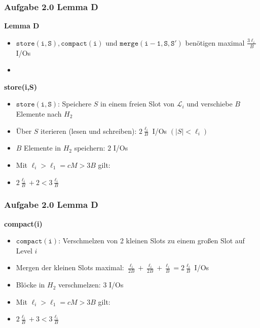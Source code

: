 \documentclass[aspectratio=169]{beamer}
\begin{document}
\begin{frame}
\frametitle{Aufgabe 2.0 Lemma D}

\textbf{Lemma D}
\begin{itemize}
	\item $\mathtt{store(i,S), compact(i)}$ und $\mathtt{merge(i-1,S,S')}$ benötigen maximal $\frac{3\ell_i}{B}$ I/Os
	\item[]
\end{itemize}
\textbf{store(i,S)}
\begin{itemize}
	\item $\mathtt{store(i,S)}$: Speichere $S$ in einem freien Slot von $\mathcal{L}_i$ und verschiebe $B$ Elemente nach $H_2$
	\item Über $S$ iterieren (lesen und schreiben): $2\frac{\ell_i}{B}$ I/Os $(|S| < \ell_i)$
	\item $B$ Elemente in $H_2$ speichern: $2$ I/Os
	\item Mit $\ell_i > \ell_1 = cM > 3B$ gilt:
	\item $2\frac{\ell_i}{B} + 2 < 3\frac{\ell_i}{B}$
	
\end{itemize}

\end{frame}

\begin{frame}
\frametitle{Aufgabe 2.0 Lemma D}

\textbf{compact(i)}
\begin{itemize}
	\item $\mathtt{compact(i)}$: Verschmelzen von 2 kleinen Slots zu einem großen Slot auf Level $i$
	\item Mergen der kleinen Slots maximal: $\frac{\ell_i}{2B} + \frac{\ell_i}{2B} + \frac{\ell_i}{B} = 2\frac{\ell_i}{B}$ I/Os
	\item Blöcke in $H_2$ verschmelzen: $3$ I/Os
	\item Mit $\ell_i > \ell_1 = cM > 3B$ gilt:
	\item $2\frac{\ell_i}{B} + 3 < 3\frac{\ell_i}{B}$
\end{itemize}

\end{frame}
\end{document}
